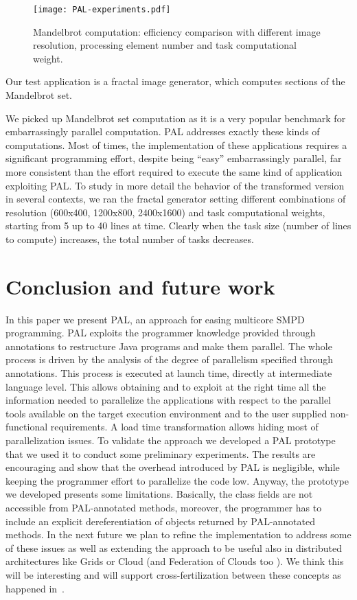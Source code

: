 \documentclass{acm_proc_article-sp}
\begin{document}
\begin{figure}
    \centering
\texttt{[image: PAL-experiments.pdf]}
    \caption{Mandelbrot computation: efficiency comparison with different image resolution, processing element number and task computational weight.}
    \label{fig:efficiency}
\end{figure}

Our test application is a fractal image generator, which computes sections of the Mandelbrot set.

We picked up Mandelbrot set computation as it is a very popular benchmark for embarrassingly parallel computation. PAL addresses exactly these kinds of computations. Most of times, the implementation of these applications requires a significant programming effort, despite being ``easy'' embarrassingly parallel, far more consistent than the effort required to execute the same kind of application exploiting PAL. 
To study in more detail the behavior of the transformed version in several contexts, we ran the fractal generator setting different combinations of resolution (600x400, 1200x800, 2400x1600) and task computational weights, starting from 5 up to 40 lines at time. Clearly when the task size (number of lines to compute) increases, the total number of tasks decreases.


\section{Conclusion and future work} \label{sec:conclusions}
In this paper we present PAL, an approach for easing multicore SMPD programming.  PAL exploits the programmer knowledge provided through annotations to restructure Java programs and make them parallel. The whole process is driven by the analysis of the degree of parallelism specified through annotations. This process is executed at launch time, directly at intermediate language level. This allows obtaining and to exploit at the right time all the information needed to parallelize the applications with respect to the parallel tools available on the target execution environment and to the user supplied non-functional requirements. A load time transformation allows hiding most of parallelization issues.
To validate the approach we developed a PAL prototype that we used it to conduct some preliminary experiments. The results are encouraging and show that the overhead introduced by PAL is negligible, while keeping the programmer effort to parallelize the code low. Anyway, the prototype we developed presents  some limitations. Basically, the class fields are not accessible from PAL-annotated methods, moreover, the programmer has to include an explicit dereferentiation of objects returned by PAL-annotated methods.
In the next future we plan to refine the implementation to address some of these issues as well as extending the approach to be useful also in distributed architectures like Grids or Cloud (and Federation of Clouds too \cite{carlini2012cloud, coppola2012contrail}).
We think this will be interesting and will support cross-fertilization between these concepts as happened in~\cite{aldinucci2008behavioural}. 



  

\balancecolumns
\end{document}
